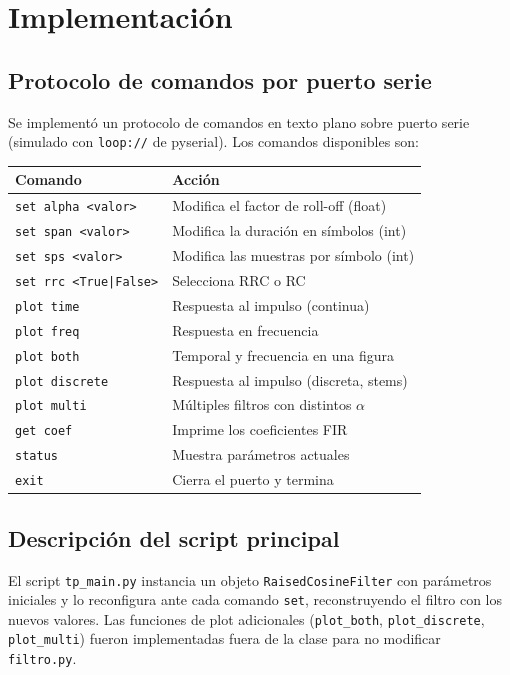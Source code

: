 \documentclass[12pt, a4paper]{article}
\begin{document}
\section{Implementación}

\subsection{Protocolo de comandos por puerto serie}

Se implementó un protocolo de comandos en texto plano sobre puerto serie
(simulado con \texttt{loop://} de pyserial). Los comandos disponibles son:

\begin{center}
\begin{tabular}{ll}
\hline
\textbf{Comando} & \textbf{Acción} \\
\hline
\texttt{set alpha <valor>} & Modifica el factor de roll-off (float) \\
\texttt{set span <valor>}  & Modifica la duración en símbolos (int) \\
\texttt{set sps <valor>}   & Modifica las muestras por símbolo (int) \\
\texttt{set rrc <True|False>} & Selecciona RRC o RC \\
\texttt{plot time}         & Respuesta al impulso (continua) \\
\texttt{plot freq}         & Respuesta en frecuencia \\
\texttt{plot both}         & Temporal y frecuencia en una figura \\
\texttt{plot discrete}     & Respuesta al impulso (discreta, stems) \\
\texttt{plot multi}        & Múltiples filtros con distintos $\alpha$ \\
\texttt{get coef}          & Imprime los coeficientes FIR \\
\texttt{status}            & Muestra parámetros actuales \\
\texttt{exit}              & Cierra el puerto y termina \\
\hline
\end{tabular}
\end{center}

\subsection{Descripción del script principal}

El script \texttt{tp\_main.py} instancia un objeto \texttt{RaisedCosineFilter}
con parámetros iniciales y lo reconfigura ante cada comando \texttt{set},
reconstruyendo el filtro con los nuevos valores. Las funciones de plot adicionales
(\texttt{plot\_both}, \texttt{plot\_discrete}, \texttt{plot\_multi}) fueron
implementadas fuera de la clase para no modificar \texttt{filtro.py}.
\end{document}
